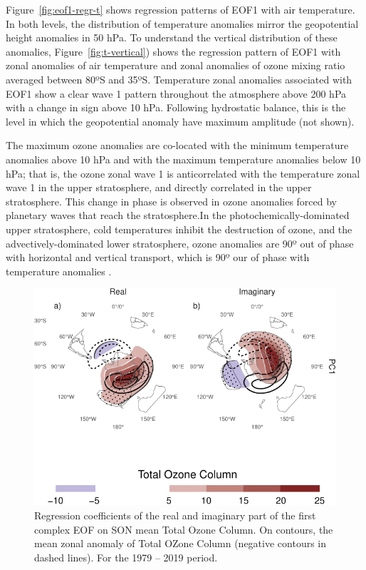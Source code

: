 \documentclass[smallextended]{svjour3}       %
\begin{document}
Figure~\ref{fig:eof1-regr-t} shows regression patterns of EOF1 with air temperature. In both levels, the distribution of temperature anomalies mirror the geopotential height anomalies in 50 hPa. To understand the vertical distribution of these anomalies, Figure~\ref{fig:t-vertical}) shows the regression pattern of EOF1 with zonal anomalies of air temperature and zonal anomalies of ozone mixing ratio averaged between 80ºS and 35ºS. Temperature zonal anomalies associated with EOF1 show a clear wave 1 pattern throughout the atmosphere above 200 hPa with a change in sign above 10 hPa. Following hydrostatic balance, this is the level in which the geopotential anomaly have maximum amplitude (not shown).

The maximum ozone anomalies are co-located with the minimum temperature anomalies above 10 hPa and with the maximum temperature anomalies below 10 hPa; that is, the ozone zonal wave 1 is anticorrelated with the temperature zonal wave 1 in the upper stratosphere, and directly correlated in the upper stratosphere. This change in phase is observed in ozone anomalies forced by planetary waves that reach the stratosphere.In the photochemically-dominated upper stratosphere, cold temperatures inhibit the destruction of ozone, and the advectively-dominated lower stratosphere, ozone anomalies are 90º out of phase with horizontal and vertical transport, which is 90º our of phase with temperature anomalies \citep{hartmann1979, wirth1993, smith1995}.



\begin{figure}
\centering
\includegraphics{../figures/o3-regr-1.pdf}
\caption{\label{fig:o3-regr}Regression coefficients of the real and imaginary part of the first complex EOF on SON mean Total Ozone Column. On contours, the mean zonal anomaly of Total OZone Column (negative contours in dashed lines). For the 1979 -- 2019 period.}
\end{figure}
\end{document}
